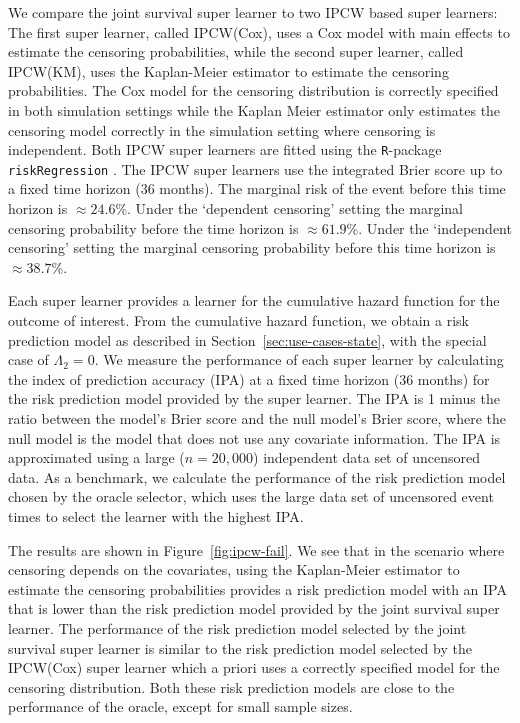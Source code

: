 \documentclass[lineno]{biometrika}
\newcommand{\1}{\mathds{1}}
\begin{document}
We compare the joint survival super learner to two IPCW based super learners: The
first super learner, called IPCW(Cox), uses a Cox model with main
effects to estimate the censoring probabilities, while the second
super learner, called IPCW(KM), uses the Kaplan-Meier estimator to
estimate the censoring probabilities. The Cox model for the censoring
distribution is correctly specified in both simulation settings while
the Kaplan Meier estimator only estimates the censoring model
correctly in the simulation setting where censoring is
independent. Both IPCW super learners are fitted using the
\texttt{R}-package \texttt{riskRegression}
\citep{Gerds_Ohlendorff_Ozenne_2023}.
%
%
The IPCW super learners use the integrated Brier score up to a fixed time
horizon (36 months). The marginal risk of the event before this time horizon is
\(\approx 24.6\)\%. Under the `dependent censoring' setting the marginal
censoring probability before the time horizon is \(\approx 61.9\)\%. Under the
`independent censoring' setting the marginal censoring probability before this
time horizon is \( \approx 38.7 \)\%.

Each super learner provides a learner for the cumulative hazard
function for the outcome of interest. From the cumulative hazard
function, we obtain a risk prediction model as described in
Section~\ref{sec:use-cases-state}, with the special case of
$\Lambda_2 = 0$. We measure the performance of each super learner by
calculating the index of prediction accuracy (IPA)
\citep{kattan2018index} at a fixed time horizon (36 months) for the
risk prediction model provided by the super learner. The IPA is 1
minus the ratio between the model's Brier score and the null model's
Brier score, where the null model is the model that does not use any
covariate information. The IPA is approximated using a large
(\( n = 20,000 \)) independent data set of uncensored data. As a
benchmark, we calculate the performance of the risk prediction model
chosen by the oracle selector, which uses the large data set of
uncensored event times to select the learner with the highest IPA.

The results are shown in Figure~\ref{fig:ipcw-fail}. We see that in
the scenario where censoring depends on the covariates, using the
Kaplan-Meier estimator to estimate the censoring probabilities
provides a risk prediction model with an IPA that is lower than the
risk prediction model provided by the joint survival super learner. The performance
of the risk prediction model selected by the joint survival super learner is similar
to the risk prediction model selected by the IPCW(Cox) super learner
which a priori uses a correctly specified model for the censoring
distribution. Both these risk prediction models are close to the
performance of the oracle, except for small sample sizes.
\end{document}
